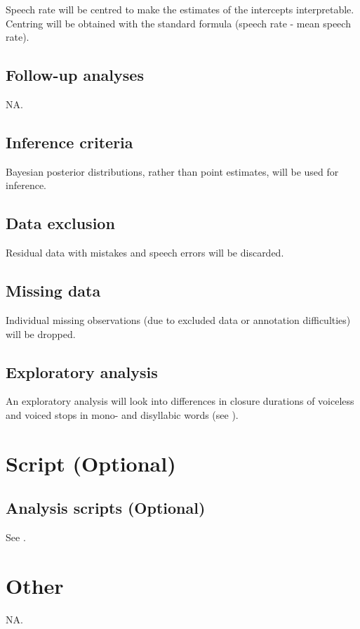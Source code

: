 \documentclass[11pt,]{article}
\begin{document}
Speech rate will be centred to make the estimates of the intercepts
interpretable. Centring will be obtained with the standard formula
(speech rate - mean speech rate).

\subsection{Follow-up analyses}\label{follow-up-analyses}

NA.

\subsection{Inference criteria}\label{inference-criteria}

Bayesian posterior distributions, rather than point estimates, will be
used for inference.

\subsection{Data exclusion}\label{data-exclusion}

Residual data with mistakes and speech errors will be discarded.

\subsection{Missing data}\label{missing-data}

Individual missing observations (due to excluded data or annotation
difficulties) will be dropped.

\subsection{Exploratory analysis}\label{exploratory-analysis}

An exploratory analysis will look into differences in closure durations
of voiceless and voiced stops in mono- and disyllabic words (see
).

\section{Script (Optional)}\label{script-optional}

\subsection{Analysis scripts
(Optional)}\label{analysis-scripts-optional}

See .

\section{Other}\label{other}

NA.


\end{document}

